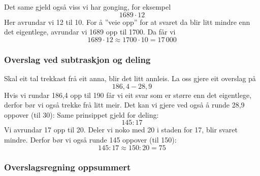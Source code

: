 \linje
Det same gjeld også viss vi har gonging, for eksempel
\[ 1689\cdot12 \]
Her avrundar vi 12 til 10. For å ''veie opp'' for at svaret da blir litt mindre enn det eigentlege, avrundar vi 1689 opp til 1700. Da får vi
\[ 1689\cdot12\approx 1700\cdot 10 =17\,000 \]
\subsubsection{Overslag ved subtraskjon og deling}
Skal  eit  tal trekkast frå  eit  anna, blir det litt annleis. La oss gjere  eit overslag på
\[ 186,4-28,9 \]
Hvis vi rundar 186,4 opp til 190 får vi  eit  svar som er større enn det eigentlege, derfor bør vi også trekke frå litt meir. Det kan vi gjere ved også å runde 28,9 oppover (til 30):
Same prinsippet gjeld for deling: 
\[ 145:17 \]
Vi avrundar 17 opp til 20. Deler vi noko med 20 i staden for 17, blir svaret mindre. Derfor bør vi også runde 145 oppover (til 150):
\[ 145:17 \approx 150:20 = 75 \]

\subsubsection{Overslagsregning oppsummert}
 \vsk

